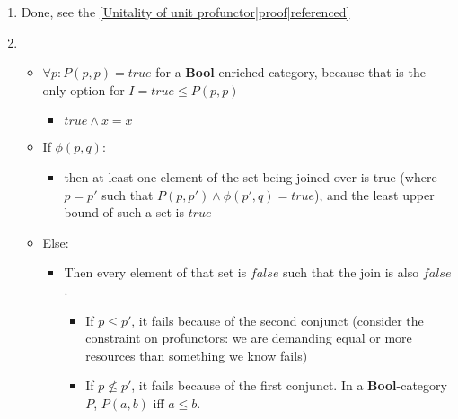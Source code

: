 \begin{enumerate}
    \item Done, see the \ref{Unitality of unit profunctor|proof|referenced}
    \item
          \begin{itemize}
            \item $\forall p: P(p,p)=true$ for a \textbf{Bool}-enriched category, because that is the only option for $I=true\leq P(p,p)$
                  \begin{itemize}
                    \item $true \land x = x$
                  \end{itemize}
            \item If $\phi(p,q)$:
                  \begin{itemize}
                    \item then at least one element of the set being joined over is true (where $p=p'$ such that $P(p,p')\land \phi(p',q) = true$), and the least upper bound of such a set is $true$
                  \end{itemize}
            \item Else:
                  \begin{itemize}
                    \item Then every element of that set is $false$ such that the join is also $false$.
                          \begin{itemize}
                            \item If $p\leq p'$, it fails because of the second conjunct (consider the constraint on profunctors: we are demanding equal or more resources than something we know fails)
                            \item If $p \not \leq p'$, it fails because of the first conjunct. In a \textbf{Bool}-category $P$, $P(a,b)$ iff $a \leq b$.
                          \end{itemize}
                  \end{itemize}
          \end{itemize}

  \end{enumerate}
